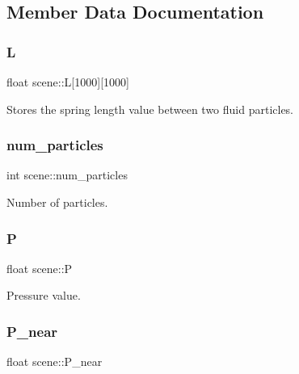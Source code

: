 \subsection{Member Data Documentation}
\hypertarget{classscene_a5567d1a6ee5b2f47e667f37738193b70}{}\label{classscene_a5567d1a6ee5b2f47e667f37738193b70} 
\subsubsection{\texorpdfstring{L}{L}}
{\footnotesize\ttfamily float scene\+::L\mbox{[}1000\mbox{]}\mbox{[}1000\mbox{]}}



Stores the spring length value between two fluid particles. 

\hypertarget{classscene_a193bc997bddf91dbd027a9fb0d37355d}{}\label{classscene_a193bc997bddf91dbd027a9fb0d37355d} 
\subsubsection{\texorpdfstring{num\+\_\+particles}{num\_particles}}
{\footnotesize\ttfamily int scene\+::num\+\_\+particles}



Number of particles. 

\hypertarget{classscene_a40cf76b52a836034c27c5637a174caf1}{}\label{classscene_a40cf76b52a836034c27c5637a174caf1} 
\subsubsection{\texorpdfstring{P}{P}}
{\footnotesize\ttfamily float scene\+::P}



Pressure value. 

\hypertarget{classscene_abab4e59ae9fd1f4fce19dd17a69d8144}{}\label{classscene_abab4e59ae9fd1f4fce19dd17a69d8144} 
\subsubsection{\texorpdfstring{P\+\_\+near}{P\_near}}
{\footnotesize\ttfamily float scene\+::\+P\+\_\+near}




